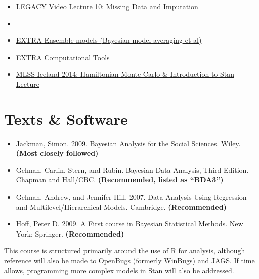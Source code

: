 \documentclass[11pt, leqno, fleqn]{article}
\begin{document}
\begin{itemize}
\item[] \href{http://youtu.be/qfpZcsb32Z4}{LEGACY Video Lecture 10: Missing Data and Imputation} \\
\item[]
\item[] \href{https://www.youtube.com/watch?v=jAVHB3D04EY}{EXTRA Ensemble models (Bayesian model averaging et al)}\\
\item[] \href{https://www.youtube.com/watch?v=kcBcYev8oaU&index=6&list=PLAFC5F02F224FA59F}{EXTRA Computational Tools}\\
\item[] \href{http://youtu.be/xWQpEAyI5s8}{MLSS Iceland 2014: Hamiltonian Monte Carlo \& Introduction to Stan Lecture} \\
\end{itemize}

\section*{Texts \& Software}
\begin{itemize}
\item[] Jackman, Simon. 2009. Bayesian Analysis for the Social Sciences. Wiley. {\bf(Most closely followed)}
\item[] Gelman, Carlin, Stern, and Rubin. Bayesian Data Analysis, Third Edition. Chapman and Hall/CRC. {\bf(Recommended, listed as ``BDA3'')}
\item[] Gelman, Andrew, and Jennifer Hill. 2007. Data Analysis Using Regression and Multilevel/Hierarchical Models. Cambridge. {\bf(Recommended)}
\item[] Hoff, Peter D. 2009. A First course in Bayesian Statistical Methods. New York: Springer. {\bf (Recommended)}
\end{itemize}
This course is structured primarily around the use of \textsf{R} for analysis, although reference will also be made to OpenBugs (formerly WinBugs) and JAGS. If time allows, programming more complex models in Stan will also be addressed.\\
\end{document}
